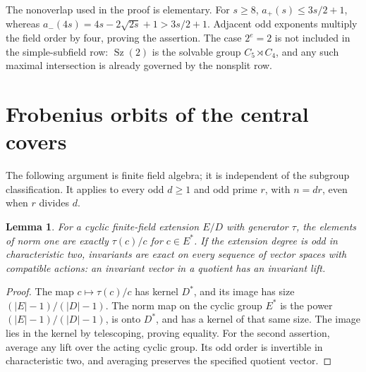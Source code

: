 \documentclass[11pt,a4paper]{article}
\newtheorem{lemma}[theorem]{Lemma}
\newcommand{\Sz}{\operatorname{Sz}}
\begin{document}
The nonoverlap used in the proof is elementary. For $s\ge8$,
$a_+(s)\le3s/2+1$, whereas
$a_-(4s)=4s-2\sqrt{2s}+1>3s/2+1$. Adjacent odd exponents
multiply the field order by four, proving the assertion.
The case $2^e=2$ is not included in the simple-subfield row:
$\Sz(2)$ is the solvable group $C_5\rtimes C_4$, and any such
maximal intersection is already governed by the nonsplit row.

\section{Frobenius orbits of the central covers}
The following argument is finite field algebra; it is independent
of the subgroup classification. It applies to every odd $d\ge1$
and odd prime $r$, with $n=dr$, even when $r$ divides $d$.

\begin{lemma}\label{hilbert}
For a cyclic finite-field extension $E/D$ with generator $\tau$,
the elements of norm one are exactly $\tau(c)/c$ for $c\in E^*$.
If the extension degree is odd in characteristic two, invariants
are exact on every sequence of vector spaces with compatible
actions: an invariant vector in a quotient has an invariant lift.
\end{lemma}
\begin{proof}
The map $c\mapsto\tau(c)/c$ has kernel $D^*$, and its image
has size $(|E|-1)/(|D|-1)$. The norm map on the cyclic group
$E^*$ is the power $(|E|-1)/(|D|-1)$, is onto $D^*$, and
has a kernel of that same size. The image lies in the kernel
by telescoping, proving equality. For the second assertion,
average any lift over the acting cyclic group. Its odd order
is invertible in characteristic two, and averaging preserves
the specified quotient vector.
\end{proof}
\end{document}
